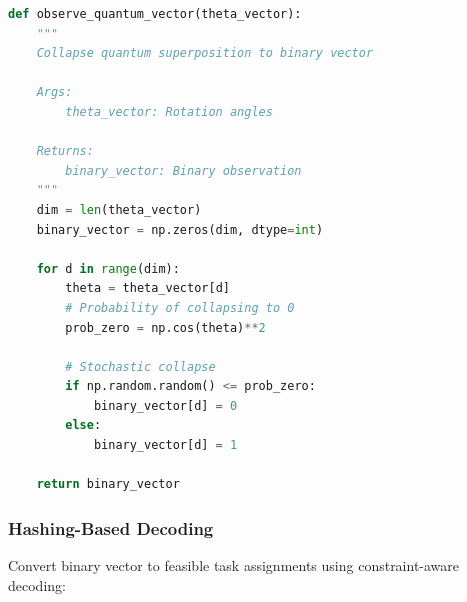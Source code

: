 \documentclass[12pt,a4paper]{article}
\begin{document}
\begin{lstlisting}[language=Python, caption=Quantum Observation (State Collapse)]
def observe_quantum_vector(theta_vector):
    """
    Collapse quantum superposition to binary vector
    
    Args:
        theta_vector: Rotation angles
    
    Returns:
        binary_vector: Binary observation
    """
    dim = len(theta_vector)
    binary_vector = np.zeros(dim, dtype=int)
    
    for d in range(dim):
        theta = theta_vector[d]
        # Probability of collapsing to 0
        prob_zero = np.cos(theta)**2
        
        # Stochastic collapse
        if np.random.random() <= prob_zero:
            binary_vector[d] = 0
        else:
            binary_vector[d] = 1
    
    return binary_vector
\end{lstlisting}

\subsubsection{Hashing-Based Decoding}

Convert binary vector to feasible task assignments using constraint-aware decoding:
\end{document}
